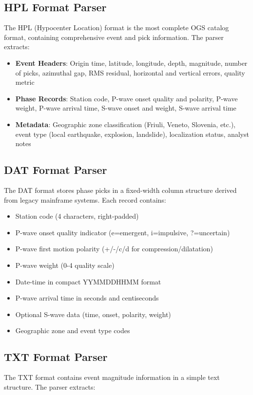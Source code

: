\subsection{HPL Format Parser}
The HPL (Hypocenter Location) format is the most complete OGS catalog format,
containing comprehensive event and pick information. The parser extracts:

\begin{itemize}
  \item \textbf{Event Headers}: Origin time, latitude, longitude, depth,
    magnitude, number of picks, azimuthal gap, RMS residual, horizontal and
    vertical errors, quality metric

  \item \textbf{Phase Records}: Station code, P-wave onset quality and
    polarity, P-wave weight, P-wave arrival time, S-wave onset and weight,
    S-wave arrival time

  \item \textbf{Metadata}: Geographic zone classification (Friuli, Veneto,
    Slovenia, etc.), event type (local earthquake, explosion, landslide),
    localization status, analyst notes
\end{itemize}

\subsection{DAT Format Parser}
The DAT format stores phase picks in a fixed-width column structure derived
from legacy mainframe systems. Each record contains:

\begin{itemize}
  \item Station code (4 characters, right-padded)
  \item P-wave onset quality indicator (e=emergent, i=impulsive, ?=uncertain)
  \item P-wave first motion polarity (+/-/c/d for compression/dilatation)
  \item P-wave weight (0-4 quality scale)
  \item Date-time in compact YYMMDDHHMM format
  \item P-wave arrival time in seconds and centiseconds
  \item Optional S-wave data (time, onset, polarity, weight)
  \item Geographic zone and event type codes
\end{itemize}

\subsection{TXT Format Parser}
The TXT format contains event magnitude information in a simple text structure.
The parser extracts:


